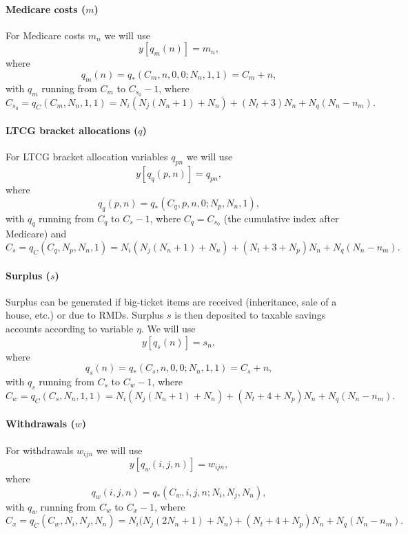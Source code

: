 \documentclass[fleqn,12pt]{report}
\begin{document}
\paragraph*{Medicare costs (\boldmath$m$)}
For Medicare costs $m_{n}$ we will use
\begin{equation}
	y[q_m(n)] = m_{n},
\end{equation}
where
\begin{equation}
	q_m(n) = q_*(C_m, n, 0, 0; N_n, 1, 1) = C_m + n,
\end{equation}
with $q_m$ running from $C_m$ to $C_{s_0} - 1$, where
\[
	C_{s_0} = q_C(C_m, N_n, 1, 1)
	= N_i(N_j(N_n+1) + N_n) + (N_t + 3) N_n + N_q(N_n - n_m).
\]

\paragraph*{LTCG bracket allocations (\boldmath$q$)}
For LTCG bracket allocation variables $q_{pn}$ we will use
\begin{equation}
	y[q_q(p, n)] = q_{pn},
\end{equation}
where
\begin{equation}
	q_q(p, n) = q_*(C_q, p, n, 0; N_p, N_n, 1),
\end{equation}
with $q_q$ running from $C_q$ to $C_s - 1$, where $C_q = C_{s_0}$ (the cumulative index after Medicare)
and
\[
	C_s = q_C(C_q, N_p, N_n, 1)
	= N_i(N_j(N_n+1) + N_n) + (N_t + 3 + N_p) N_n + N_q(N_n - n_m).
\]

\paragraph*{Surplus (\boldmath$s$)}
Surplus can be generated if big-ticket items are received (inheritance, sale of a house, etc.)
or due to RMDs. Surplus $s$ is then deposited to taxable savings accounts according
to variable $\eta$. We will use
\begin{equation}
	y[q_s(n)] = s_{n},
\end{equation}
where
\begin{equation}
	q_s(n) = q_*(C_s, n, 0, 0; N_n, 1, 1) = C_s + n,
\end{equation}
with $q_s$ running from $C_s$ to $C_w - 1$, where
\[
	C_w = q_C(C_s, N_n, 1, 1)
	= N_i(N_j(N_n+1) + N_n) + (N_t + 4 + N_p) N_n + N_q(N_n - n_m).
\]

\paragraph*{Withdrawals (\boldmath$w$)}
For withdrawals $w_{ijn}$ we will use
\begin{equation}
	y[q_w(i, j, n)] = w_{i j n},
\end{equation}
where
\begin{equation}
	q_w(i, j, n) = q_*(C_w, i, j, n; N_i, N_j, N_n),
\end{equation}
with $q_w$ running from $C_w$ to $C_x - 1$, where
\[
C_x = q_C(C_w, N_i, N_j, N_n)
= N_i\bigl(N_j(2N_n + 1) + N_n\bigr) + (N_t + 4 + N_p) N_n + N_q(N_n - n_m).
\]
\end{document}
